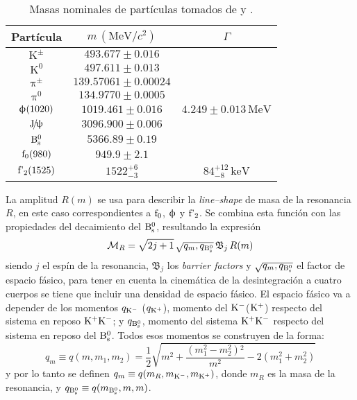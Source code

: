 \begin{table}[H]
  \centering
  \begin{tabular}{ccc}
\toprule
Partícula & $m \, (\text{MeV}/c^2)$  & $\Gamma$ \\ \midrule
$\mathrm{K^{\pm}}$    & $ 493.677\pm0.016 $\\
$\mathrm{K^{0}}$      & $497.611\pm0.013$\\
$\uppi^{\pm}$         & $139.57061\pm0.00024$\\
$\uppi^{0}$           & $134.9770\pm0.0005$\\
$\upphi (1020)$         & $1019.461\pm0.016$  & $4.249\pm0.013 \, \text{MeV}$\\
$\text{J}\!/\!\uppsi$               & $3096.900\pm0.006$  \\%
$\text{B}{}_{\text{s}}^{\text{0}}$                 & $5366.89\pm0.19$ \\ \midrule
$\text{f}_0 (980)$        & $949.9\pm2.1$ \\
$\text{f'}_2 (1525)$       & $1522_{-3}^{+6}$          & $84_{-8}^{+12} \, \text{keV}$\\
\bottomrule
  \end{tabular}
  \caption{Masas nominales de partículas tomados de \cite[primer bloque]{pdg2018} y \cite[segundo bloque]{Aaij:1664567}.} \label{tab_massPDG}
\end{table}
\color{norm}


\color{new}
La amplitud $R(m)$ se usa para describir la \emph{line--shape} de masa de la resonancia $R$, en este caso correspondientes a $\text{f}_0$, $\upphi$ y $\text{f'}_2$. Se combina esta función con las propiedades del decaimiento del $\text{B}{}_{\text{s}}^{\text{0}}$, resultando la expresión \cite{Aaij:1664567}  
\begin{equation}
  \mathcal{M}_R = \sqrt{2 j + 1}\, \sqrt{q_m,q_{\text{B}{}_{\text{s}}^{\text{0}}}} \,\mathfrak{B}_j \, R(m) \label{eq:masslineshape}
\end{equation}
siendo $j$ el espín de la resonancia, $\mathfrak{B}_j$ los \emph{barrier factors} y  $\sqrt{q_m,q_{\text{B}{}_{\text{s}}^{\text{0}}}}$ el factor de espacio fásico, para tener en cuenta la cinemática de la desintegración a cuatro cuerpos se tiene que incluir una densidad de espacio fásico.
%
%
%
%
%
\color{norm}
%
El espacio fásico va a depender de los momentos $q_{\text{K}{}^{-}}$  ($q_{\text{K}{}^{+}}$), momento del $\text{K}{}^{-}$($\text{K}{}^{+}$) respecto del sistema en reposo $\text{K}{}^{+}\text{K}{}^{-}$; y  $q_{\text{B}{}_{\text{s}}^{\text{0}}}$, momento del sistema $\text{K}{}^{+}\text{K}{}^{-}$ respecto del sistema en reposo del $\text{B}{}_{\text{s}}^{\text{0}}$. Todos esos momentos se construyen de la forma:
\begin{equation}
q_m \equiv q(m,m_1,m_2) = \frac{1}{2}  \sqrt{m^2+\frac{\left(m_1^2-m_2^2\right){}^2}{m^2}-2 \left(m_1^2+m_2^2\right)}	
\end{equation}
y por lo tanto se definen $q_m \equiv q(m_R,m_{\text{K}{}^{-}},m_{\text{K}{}^{+}})$, donde $m_R$ es la masa de la resonancia, y $q_{\text{B}{}_{\text{s}}^{\text{0}}} \equiv q(m_{\text{B}{}_{\text{s}}^{\text{0}}},m,m)$.



